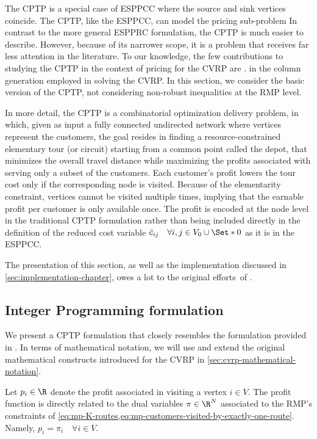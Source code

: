 The CPTP is a special case of ESPPCC where the source and sink vertices coincide.
The CPTP, like the ESPPCC, can model the pricing sub-problem
In contrast to the more general ESPPRC formulation, the CPTP is much easier to describe.
However, because of its narrower scope, it is a problem that receives far less attention in the literature.
To our knowledge, the few contributions to studying the CPTP in the context of pricing
for the CVRP are \textcite{bixby1999, jepsen2011,jepsen2014}.
in the column generation employed in solving the CVRP.
In this section, we consider the basic version of the CPTP,
not considering non-robust inequalities at the RMP level.

\medskip

In more detail,
the CPTP is a combinatorial optimization delivery problem,
in which,
given as input a fully connected undirected network where vertices represent the customers,
the goal resides in finding a resource-constrained elementary tour (or circuit)
starting from a common point called the depot,
that minimizes the overall travel distance while maximizing
the profits associated with serving only a subset of the customers.
Each customer's profit lowers the tour cost only if the corresponding node is visited.
Because of the elementarity constraint,
vertices cannot be visited multiple times,
implying that the earnable profit per customer is only available once.
The profit is encoded at the node level in the traditional CPTP formulation \parencite{jepsen2014}
rather than being included directly in the definition of the reduced cost variable
$\bar{c}_{ij} \quad \forall i, j \in V_0 \cup \Set*{0}$ as it is in the ESPPCC.

The presentation of this section, as well as the implementation discussed
in \cref{sec:implementation-chapter},
owes a lot to the original efforts of \textcite{jepsen2014}.

\subsection{Integer Programming formulation}
\label{sec:cptp-integer-programming-formulation}

We present a CPTP formulation that closely resembles the formulation provided in \textcite{jepsen2014}.
In terms of mathematical notation, we will use and extend the original
mathematical constructs introduced for the CVRP in \cref{sec:cvrp-mathematical-notation}.

Let $p_i \in \R$ denote the profit associated in visiting a vertex $i \in V$.
The profit function is directly related to the dual variables $\pi \in \R^N$ associated to
the RMP's constraints of \cref{eq:mp-K-routes,eq:mp-customers-visited-by-exactly-one-route}.
Namely, $p_i = \pi_i \quad \forall i \in V$.

